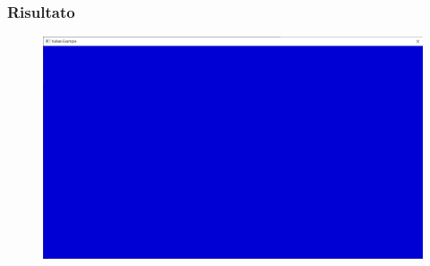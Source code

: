 \begin{frame}
\frametitle{Risultato}

\begin{figure}[ht]
    \centering
    \includegraphics[scale=0.25]{images/SlidesClearWindow/ClearWindow.png}
\end{figure}

\end{frame}
